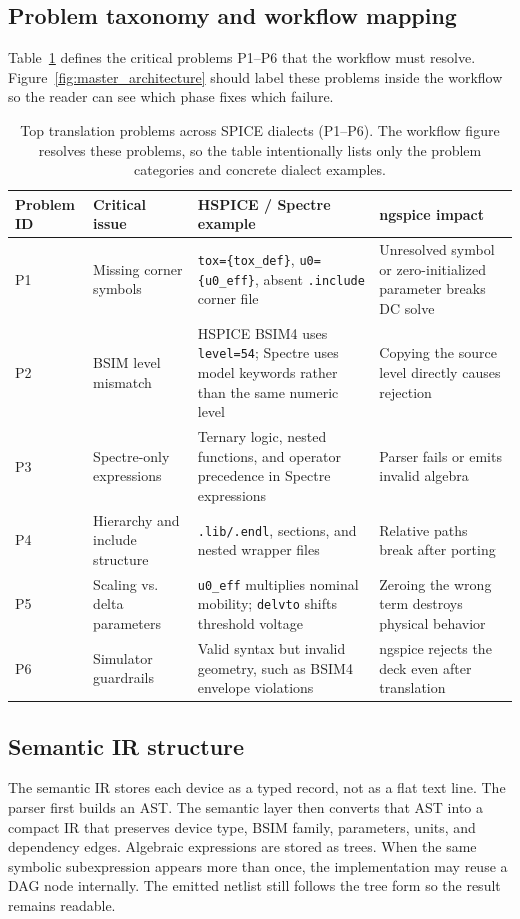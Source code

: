 \documentclass[conference]{IEEEtran}
\begin{document}
\subsection{Problem taxonomy and workflow mapping}
Table~\ref{tab:critical_diffs} defines the critical problems P1--P6 that the workflow must resolve. Figure~\ref{fig:master_architecture} should label these problems inside the workflow so the reader can see which phase fixes which failure.

\begin{table}[!t]
\caption{Top translation problems across SPICE dialects (P1--P6). The workflow figure resolves these problems, so the table intentionally lists only the problem categories and concrete dialect examples.}
\label{tab:critical_diffs}
\centering
\footnotesize
\begin{tabular}{@{}p{1.5cm}p{4.5cm}p{4.7cm}p{4.5cm}@{}}
\toprule
\textbf{Problem ID} & \textbf{Critical issue} & \textbf{HSPICE / Spectre example} & \textbf{ngspice impact} \\
\midrule
P1 & Missing corner symbols & \texttt{tox=\{tox\_def\}}, \texttt{u0=\{u0\_eff\}}, absent \texttt{.include} corner file & Unresolved symbol or zero-initialized parameter breaks DC solve \\
P2 & BSIM level mismatch & HSPICE BSIM4 uses \texttt{level=54}; Spectre uses model keywords rather than the same numeric level & Copying the source level directly causes rejection \\
P3 & Spectre-only expressions & Ternary logic, nested functions, and operator precedence in Spectre expressions & Parser fails or emits invalid algebra \\
P4 & Hierarchy and include structure & \texttt{.lib/.endl}, sections, and nested wrapper files & Relative paths break after porting \\
P5 & Scaling vs. delta parameters & \texttt{u0\_eff} multiplies nominal mobility; \texttt{delvto} shifts threshold voltage & Zeroing the wrong term destroys physical behavior \\
P6 & Simulator guardrails & Valid syntax but invalid geometry, such as BSIM4 envelope violations & ngspice rejects the deck even after translation \\
\bottomrule
\end{tabular}
\end{table}

\subsection{Semantic IR structure}
The semantic IR stores each device as a typed record, not as a flat text line. The parser first builds an AST. The semantic layer then converts that AST into a compact IR that preserves device type, BSIM family, parameters, units, and dependency edges. Algebraic expressions are stored as trees. When the same symbolic subexpression appears more than once, the implementation may reuse a DAG node internally. The emitted netlist still follows the tree form so the result remains readable.
\end{document}
